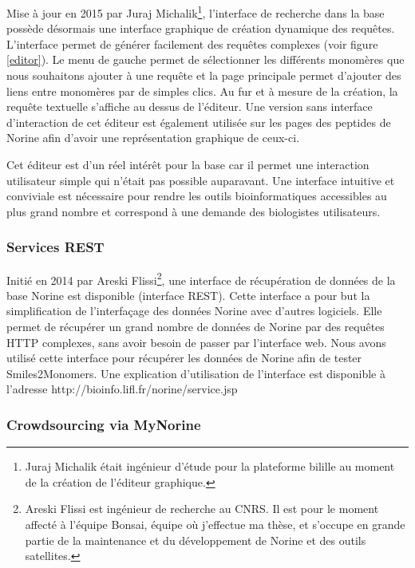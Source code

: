 Mise à jour en 2015 par Juraj Michalik\footnote{Juraj Michalik était ingénieur d'étude pour la plateforme bilille au moment de la création de l'éditeur graphique.}, l'interface de recherche dans la base possède désormais une interface graphique de création dynamique des requêtes.
L'interface permet de générer facilement des requêtes complexes (voir figure \ref{editor}).
Le menu de gauche permet de sélectionner les différents monomères que nous souhaitons ajouter à une requête et la page principale permet d'ajouter des liens entre monomères par de simples clics.
Au fur et à mesure de la création, la requête textuelle s'affiche au dessus de l'éditeur.
Une version sans interface d'interaction de cet éditeur est également utilisée sur les pages des peptides de Norine afin d'avoir une représentation graphique de ceux-ci.

Cet éditeur est d'un réel intérêt pour la base car il permet une interaction utilisateur simple qui n'était pas possible auparavant.
Une interface intuitive et conviviale est nécessaire pour rendre les outils bioinformatiques accessibles au plus grand nombre et correspond à une demande des biologistes utilisateurs.



\subsubsection{Services REST}

Initié en 2014 par Areski Flissi\footnote{Areski Flissi est ingénieur de recherche au CNRS. Il est pour le moment affecté à l'équipe Bonsai, équipe où j'effectue ma thèse, et s'occupe en grande partie de la maintenance et du développement de Norine et des outils satellites.}, une interface de récupération de données de la base Norine est disponible (interface REST).
Cette interface a pour but la simplification de l'interfaçage des données Norine avec d'autres logiciels.
Elle permet de récupérer un grand nombre de données de Norine par des requêtes HTTP complexes, sans avoir besoin de passer par l'interface web.
Nous avons utilisé cette interface pour récupérer les données de Norine afin de tester Smiles2Monomers.
Une explication d'utilisation de l'interface est disponible à l'adresse http://bioinfo.lifl.fr/norine/service.jsp



\subsubsection{Crowdsourcing via MyNorine}

